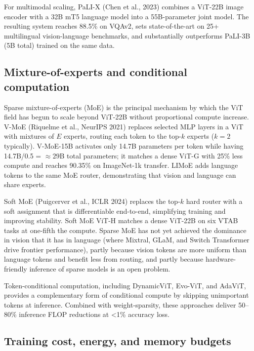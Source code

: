 For multimodal scaling, PaLI-X (Chen et al., 2023) combines a ViT-22B image encoder with a 32B mT5 language model into a 55B-parameter joint model. The resulting system reaches 88.5\% on VQAv2, sets state-of-the-art on 25+ multilingual vision-language benchmarks, and substantially outperforms PaLI-3B (5B total) trained on the same data.

\subsection{Mixture-of-experts and conditional computation}\label{mixture-of-experts-and-conditional-computation}

Sparse mixture-of-experts (MoE) is the principal mechanism by which the ViT field has begun to scale beyond ViT-22B without proportional compute increase. V-MoE (Riquelme et al., NeurIPS 2021) replaces selected MLP layers in a ViT with mixtures of \(E\) experts, routing each token to the top-\(k\) experts (\(k=2\) typically). V-MoE-15B activates only 14.7B parameters per token while having 14.7B/0.5 = \(\approx 29\)B total parameters; it matches a dense ViT-G with 25\% less compute and reaches 90.35\% on ImageNet-1k transfer. LIMoE adds language tokens to the same MoE router, demonstrating that vision and language can share experts.

Soft MoE (Puigcerver et al., ICLR 2024) replaces the top-\(k\) hard router with a soft assignment that is differentiable end-to-end, simplifying training and improving stability. Soft MoE ViT-H matches a dense ViT-22B on six VTAB tasks at one-fifth the compute. Sparse MoE has not yet achieved the dominance in vision that it has in language (where Mixtral, GLaM, and Switch Transformer drive frontier performance), partly because vision tokens are more uniform than language tokens and benefit less from routing, and partly because hardware-friendly inference of sparse models is an open problem.

Token-conditional computation, including DynamicViT, Evo-ViT, and AdaViT, provides a complementary form of conditional compute by skipping unimportant tokens at inference. Combined with weight-sparsity, these approaches deliver 50--80\% inference FLOP reductions at \textless1\% accuracy loss.

\subsection{Training cost, energy, and memory budgets}\label{training-cost-energy-and-memory-budgets}

